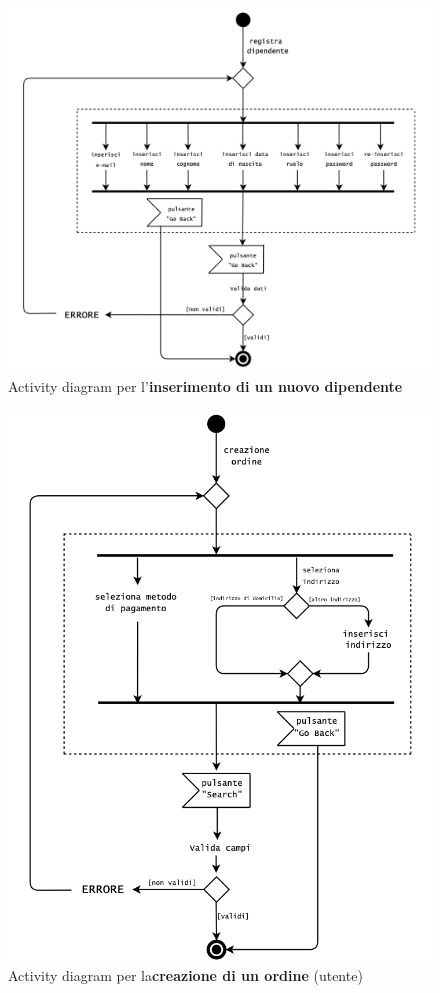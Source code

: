 \documentclass[12pt,a4paper]{article}
\begin{document}
	\newpage
	\begin{figure}[h!]
		\centering
		\includegraphics[scale=0.5]{images/ActivityDiagrams/RegistraDipendente.png}
		\caption{Activity diagram per l'\textbf{inserimento di un nuovo dipendente}}
	\end{figure}
	\begin{figure}[h!]
		\centering
		\includegraphics[scale=0.55]{images/ActivityDiagrams/CreazioneOrdineUtente.png}
		\caption{Activity diagram per la\textbf{creazione di un ordine} (utente)}
	\end{figure}
\end{document}
